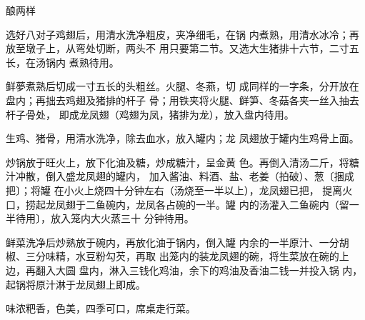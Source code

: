 \begin{recipe}[酿龙凤翅]{酿两样}

\ingredients


\cooking

\step 选好八对子鸡翅后，用清水洗净粗皮，夹净细毛，在锅 内煮熟，用清水冰冷；再放至墩子上，从弯处切断，两头不 用只要第二节。又选大生猪排十六节，二寸五长，在汤锅内 煮熟待用。

\step 鲜夢煮熟后切成一寸五长的头粗丝。火腿、冬燕，切 成同样的一字条，分开放在盘内；再拙去鸡翅及猪排的杆子 骨；用铁夹将火腿、鲜笋、冬菇各夹一丝入抽去杆子骨处， 即成龙凤翅（鸡翅为凤，猪排为龙），放入盘内待用。

\step 生鸡、猪骨，用清水洗净，除去血水，放入罐内；龙 凤翅放于罐内生鸡骨上面。

\step 炒锅放于旺火上，放下化油及糖，炒成糖汁，呈金黄 色。再倒入清汤二斤，将糖汁冲散，倒入盛龙凤翅的罐内， 加入酱油、料酒、盐、老姜（拍破）、葱〔捆成把〕；将罐 在小火上烧四十分钟左右（汤烧至一半以上），龙凤翅已把， 提离火口，捞起龙凤翅于二鱼碗内，龙凤各占碗的一半。罐 内的汤灌入二鱼碗内（留一半待用〕，放入笼内大火蒸三十 分钟待用。

\step 鲜菜洗净后炒熟放于碗内，再放化油于锅内，倒入罐 内余的一半原汁、一分胡椒、三分味精，水豆粉勾芡，再取 出笼内的装龙凤翅的碗，将生菜放在碗的上边，再翻入大圆 盘内，淋入三钱化鸡油，余下的鸡油及香油二钱一并投入锅 内，起锅将原汁淋于龙凤翅上即成。

\notes

味浓粑香，色美，四季可口，席桌走行菜。

\end{recipe}

